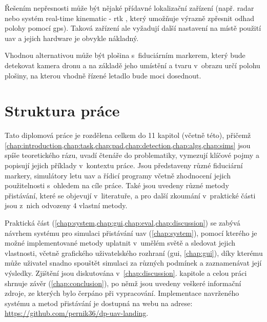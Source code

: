 Řešením nepřesnosti může být nějaké přídavné lokalizační zařízení (např. radar nebo systém real-time kinematic - \acrshort{rtk} \cite{rtk}, který umožňuje výrazně zpřesnit odhad polohy pomocí \acrshort{gps}). Taková zařízení ale vyžadují další nastavení na místě použití \acrshort{uav} a jejich hardware je obvykle nákladný.

Vhodnou alternativou může být plošina s~fiduciárním markerem, který bude detekovat kamera dronu a na základě jeho umístění a tvaru v~obrazu určí polohu plošiny, na kterou vhodně řízené letadlo bude moci dosednout.

\section{Struktura práce}
Tato diplomová práce je rozdělena celkem do 11 kapitol (včetně této), přičemž \cref{chap:introduction,chap:task,chap:pad,chap:detection,chap:algs,chap:sims} jsou spíše teoretického rázu, uvadí čtenáře do problematiky, vymezují klíčové pojmy a popisují jejich příklady v~kontextu práce. Jsou představeny různé fiduciární markery, simulátory letu \acrshort{uav} a řídicí programy včetně zhodnocení jejich použitelnosti s~ohledem na cíle práce. Také jsou uvedeny různé metody přistávání, které se objevují v~literatuře, a pro další zkoumání v~praktické části jsou z~nich odvozeny 4 vlastní metody.

Praktická část (\cref{chap:system,chap:gui,chap:eval,chap:discussion}) se zabývá návrhem systému pro simulaci přistávání \acrshort{uav} (\cref{chap:system}), pomocí kterého je možné implementované metody uplatnit v~umělém světě a sledovat jejich vlastnosti, včetně grafického uživatelského rozhraní (\acrshort{gui}, \cref{chap:gui}), díky kterému může uživatel snadno spouštět simulaci za různých podmínek a zaznamenávat její výsledky. Zjištění jsou diskutována v~\ref{chap:discussion}. kapitole a celou práci shrnuje závěr (\cref{chap:conclusion}), po němž jsou uvedeny veškeré informační zdroje, ze kterých bylo čerpáno při vypracování. Implementace navrženého systému a metod přistávání je dostupná na webu na adrese: \url{https://github.com/pernik36/dp-uav-landing}.